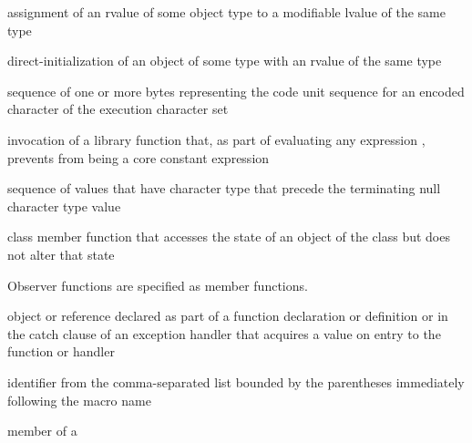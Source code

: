 %
assignment of an rvalue of some object type to a modifiable lvalue of the same type

%
direct-initialization of an object of some type with an rvalue of the same type

%
sequence of one or more bytes representing
the code unit sequence for an encoded character of the execution character set

%
invocation of a library function that,
as part of evaluating any expression ,
prevents  from being a core constant expression

%
%
sequence of values that have
character type
that precede the terminating null character type
value

%
class member function that accesses the state of an object of the class
but does not alter that state

\begin{defnote}
Observer functions are specified as
member functions.
\end{defnote}

%
%
%
 object or reference declared as part of a function declaration or
definition or in the catch clause of an exception handler that
acquires a value on entry to the function or handler

%
%
 identifier from
the comma-separated list bounded by the parentheses immediately
following the macro name

%
%
 member of a 

